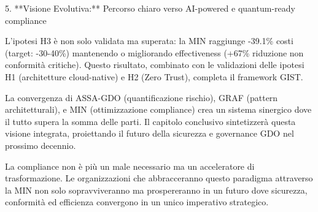 5. **Visione Evolutiva:** Percorso chiaro verso AI-powered e quantum-ready compliance

L'ipotesi H3 è non solo validata ma superata: la MIN raggiunge -39.1\% costi (target: -30-40\%) mantenendo o migliorando effectiveness (+67\% riduzione non conformità critiche). Questo risultato, combinato con le validazioni delle ipotesi H1 (architetture cloud-native) e H2 (Zero Trust), completa il framework GIST.

La convergenza di ASSA-GDO (quantificazione rischio), GRAF (pattern architetturali), e MIN (ottimizzazione compliance) crea un sistema sinergico dove il tutto supera la somma delle parti. Il capitolo conclusivo sintetizzerà questa visione integrata, proiettando il futuro della sicurezza e governance GDO nel prossimo decennio.

La compliance non è più un male necessario ma un acceleratore di trasformazione. Le organizzazioni che abbracceranno questo paradigma attraverso la MIN non solo sopravviveranno ma prospereranno in un futuro dove sicurezza, conformità ed efficienza convergono in un unico imperativo strategico.

\printbibliography[
    heading=subbibliography,
    title={Riferimenti Bibliografici},
]

